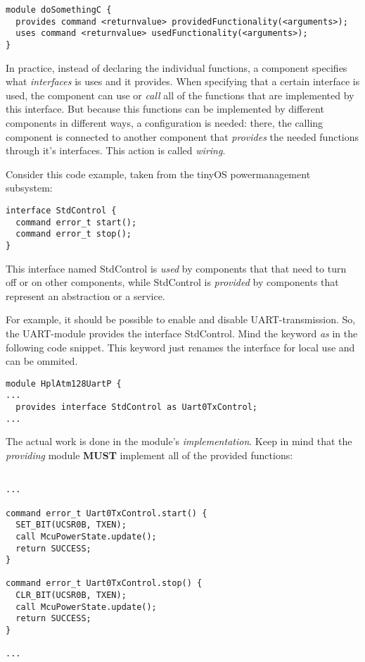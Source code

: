 \lstset{language=C}
\begin{lstlisting}
module doSomethingC {
  provides command <returnvalue> providedFunctionality(<arguments>);
  uses command <returnvalue> usedFunctionality(<arguments>);
}
\end{lstlisting}

In practice, instead of declaring the individual functions, a component specifies what \textit{interfaces} is uses and it provides. When specifying that a certain interface is used, the component can use or \textit{call} all of the functions that are implemented by this interface. But because this functions can be implemented by different components in different ways, a configuration is needed: there, the calling component is connected to another component that \textit{provides} the needed functions through it's interfaces. This action is called \textit{wiring}.

Consider this code example, taken from the tinyOS powermanagement subsystem:

\lstset{language=C}
\begin{lstlisting}
interface StdControl {
  command error_t start();
  command error_t stop();
}
\end{lstlisting}

This interface named StdControl is \textit{used} by components that that need to turn off or on other components, while StdControl is \textit{provided} by components that represent an abstraction or a service.

For example, it should be possible to enable and disable UART-transmission. So, the UART-module provides the interface StdControl. Mind the keyword \textit{as} in the following code snippet. This keyword just renames the interface for local use and can be ommited.

\lstset{language=C}
\begin{lstlisting}
module HplAtm128UartP {
...
  provides interface StdControl as Uart0TxControl;
...
\end{lstlisting}

The actual work is done in the module's \textit{implementation}. Keep in mind that the \textit{providing} module \textbf{MUST} implement all of the provided functions:

\lstset{language=C}
\begin{lstlisting}

...

command error_t Uart0TxControl.start() {
  SET_BIT(UCSR0B, TXEN);
  call McuPowerState.update();
  return SUCCESS;
}

command error_t Uart0TxControl.stop() {
  CLR_BIT(UCSR0B, TXEN);
  call McuPowerState.update();
  return SUCCESS;
}

...

\end{lstlisting}

